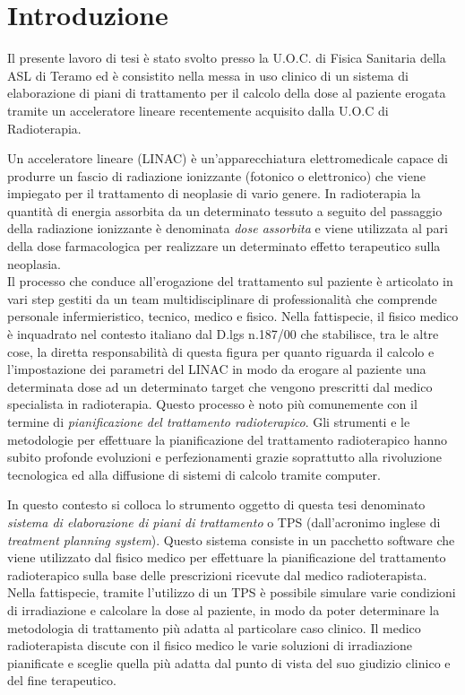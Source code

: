 \chapter*{Introduzione} 
Il presente lavoro di tesi è stato svolto presso la U.O.C. di Fisica Sanitaria della ASL di Teramo ed è consistito nella messa in uso clinico di un sistema di elaborazione di piani di trattamento per il calcolo della dose al paziente erogata tramite un acceleratore lineare recentemente acquisito dalla U.O.C di Radioterapia. 

Un acceleratore lineare (LINAC) è un'apparecchiatura elettromedicale capace di produrre un fascio di radiazione ionizzante (fotonico o elettronico) che viene impiegato per il trattamento di neoplasie di vario genere. In radioterapia la quantità di energia assorbita da un determinato tessuto a seguito del passaggio della radiazione ionizzante è denominata \textit{dose assorbita} e viene utilizzata al pari della dose farmacologica per realizzare un determinato effetto terapeutico sulla neoplasia.\\
Il processo che conduce all'erogazione del trattamento sul paziente è articolato in vari step gestiti da un team multidisciplinare di professionalità che comprende personale infermieristico, tecnico, medico e fisico. Nella fattispecie, il fisico medico è inquadrato nel contesto italiano dal D.lgs n.187/00 che stabilisce, tra le altre cose, la diretta responsabilità di questa figura per quanto riguarda il calcolo e l'impostazione dei parametri del LINAC in modo da erogare al paziente una determinata dose ad un determinato target che vengono prescritti dal medico specialista in radioterapia. Questo processo è noto più comunemente con il termine di \textit{pianificazione del trattamento radioterapico}. Gli strumenti e le metodologie per effettuare la pianificazione del trattamento radioterapico hanno subito profonde evoluzioni e perfezionamenti grazie soprattutto alla rivoluzione tecnologica ed alla diffusione di sistemi di calcolo tramite computer. 

In questo contesto si colloca lo strumento oggetto di questa tesi denominato \textit{sistema di elaborazione di piani di trattamento} o TPS (dall'acronimo inglese di \textit{treatment planning system}). Questo sistema consiste in un pacchetto software che viene utilizzato dal fisico medico per effettuare la pianificazione del trattamento radioterapico sulla base delle prescrizioni ricevute dal medico radioterapista. Nella fattispecie, tramite l'utilizzo di un TPS è possibile simulare varie condizioni di irradiazione e calcolare la dose al paziente, in modo da poter determinare la metodologia di trattamento più adatta al particolare caso clinico. Il medico radioterapista discute con il fisico medico le varie soluzioni di irradiazione pianificate e sceglie quella più adatta dal punto di vista del suo giudizio clinico e del fine terapeutico.

